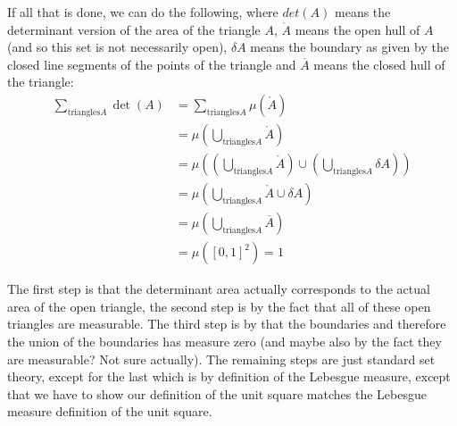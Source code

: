 If all that is done, we can do the following, where $det(A)$ means the determinant version of the
area of the triangle $A$, $\mathring{A}$ means the open hull of $A$ (and so this set is not necessarily
open), $\delta A$ means the boundary as given by the closed line segments of the points of the triangle
and $\overline A$ means the closed hull of the triangle:
\begin{equation}
\begin{split}
  \sum_{\text{triangles} A} \det(A) & = \sum_{\text{triangles} A} \mu (\mathring {A}) \\
  & =\mu (\bigcup_{\text{triangles} A} \mathring{A}) \\
  & = \mu ((\bigcup_{\text{triangles} A} \mathring{A}) \cup (\bigcup_{\text{triangles} A} \delta A)) \\
  & = \mu (\bigcup_{\text{triangles} A} \mathring {A} \cup \delta A) \\
  & = \mu (\bigcup_{\text{triangles} A} \overline{A}) \\
  & = \mu ([0,1]^2) = 1


\end{split}
\end{equation}

The first step is that the determinant area actually corresponds to the actual area of the open
triangle, the second step is by the fact that all of these open triangles are measurable. The third
step is by that the boundaries and therefore the union of the boundaries has measure zero (and maybe
also by the fact they are measurable? Not sure actually). The remaining steps are just standard set theory,
except for the last which is by definition of the Lebesgue measure, except that we have to show
our definition of the unit square matches the Lebesgue measure definition of the unit square.
